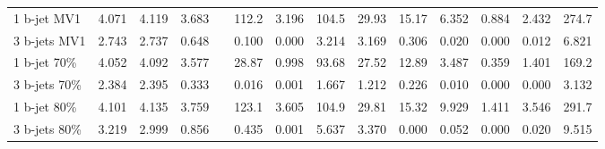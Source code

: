 \begin{table}
\begin{center}
{\begin{tabular}{l||cccc||cc|ccc|ccc||c }
            1 b-jet MV1   &        4.071 &        4.119 &        3.683 &              &        112.2 &       3.196  &      104.5   &       29.93  &       15.17  &        6.352 &        0.884 &        2.432 &      274.7      \\        
            3 b-jets MV1  &        2.743 &        2.737 &        0.648 &              &        0.100 &        0.000 &        3.214 &        3.169 &        0.306 &        0.020 &        0.000 &        0.012 &        6.821    \\\hline  
                                                                                                                                                                                                                     
            1 b-jet  70\% &        4.052 &        4.092 &        3.577 &              &       28.87  &        0.998 &       93.68  &       27.52  &       12.89  &        3.487 &        0.359 &        1.401 &      169.2      \\        
            3 b-jets 70\% &        2.384 &        2.395 &        0.333 &              &        0.016 &        0.001 &        1.667 &        1.212 &        0.226 &        0.010 &        0.000 &        0.000 &        3.132    \\\hline  
                                                                                                                                                                                                                     
            1 b-jet 80\%  &        4.101 &        4.135 &        3.759 &              &      123.1   &        3.605 &      104.9   &       29.81  &       15.32  &        9.929 &        1.411 &        3.546 &      291.7      \\        
            3 b-jets 80\% &        3.219 &        2.999 &        0.856 &              &        0.435 &        0.001 &        5.637 &        3.370 &        0.000 &        0.052 &        0.000 &        0.020 &        9.515    \\\hline  
                                                                                                                                                                                                                     

\end{tabular}}
\end{center}
\end{table}

